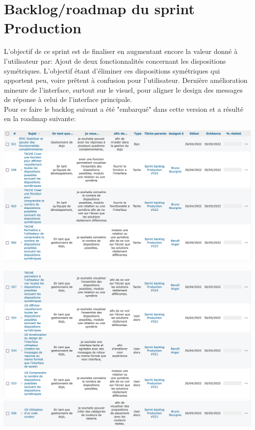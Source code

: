 \section{Backlog/roadmap du sprint Production}

L’objectif de ce sprint est de finaliser en augmentant encore la valeur donné à l'utilisateur par:
Ajout de deux fonctionnalités concernant les dispositions symétriques. L’objectif étant d'éliminer ces dispositions
symétriques qui apportent peu, voire prêtent à confusion pour l’utilisateur.
Dernière amélioration mineure de l’interface, surtout sur le visuel, pour aligner le design des messages de réponse
à celui de l’interface principale.\\

Pour ce faire le backlog suivant a été "embarqué" dans cette version et a résulté en la roadmap suivante:


\begin{center}
    \includegraphics[width=17cm]{images/roadmap-prod-part1.png}
\end{center}

\begin{center}
    \includegraphics[width=17cm]{images/roadmap-prod-part2.png}
    \includegraphics[width=17cm]{images/roadmap-prod-part3.png}
\end{center}

